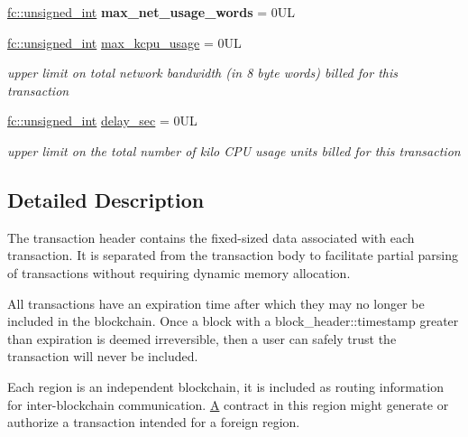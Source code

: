 \begin{DoxyCompactItemize}
\mbox{\label{structaacio_1_1chain_1_1transaction__header_a93d0c99de80b72d19810a625adbb388f}} 
\mbox{\hyperlink{structfc_1_1unsigned__int}{fc\+::unsigned\+\_\+int}} {\bfseries max\+\_\+net\+\_\+usage\+\_\+words} = 0\+UL
\item 
\mbox{\label{structaacio_1_1chain_1_1transaction__header_ae053caa430e5ec80248ddb445e081029}} 
\mbox{\hyperlink{structfc_1_1unsigned__int}{fc\+::unsigned\+\_\+int}} \mbox{\hyperlink{structaacio_1_1chain_1_1transaction__header_ae053caa430e5ec80248ddb445e081029}{max\+\_\+kcpu\+\_\+usage}} = 0\+UL
\begin{DoxyCompactList}\small\item\em upper limit on total network bandwidth (in 8 byte words) billed for this transaction \end{DoxyCompactList}\item 
\mbox{\label{structaacio_1_1chain_1_1transaction__header_a383fbc0b9ab2e344e44c054e9bcacfae}} 
\mbox{\hyperlink{structfc_1_1unsigned__int}{fc\+::unsigned\+\_\+int}} \mbox{\hyperlink{structaacio_1_1chain_1_1transaction__header_a383fbc0b9ab2e344e44c054e9bcacfae}{delay\+\_\+sec}} = 0\+UL
\begin{DoxyCompactList}\small\item\em upper limit on the total number of kilo C\+PU usage units billed for this transaction \end{DoxyCompactList}\end{DoxyCompactItemize}


\subsection{Detailed Description}
The transaction header contains the fixed-\/sized data associated with each transaction. It is separated from the transaction body to facilitate partial parsing of transactions without requiring dynamic memory allocation.

All transactions have an expiration time after which they may no longer be included in the blockchain. Once a block with a block\+\_\+header\+::timestamp greater than expiration is deemed irreversible, then a user can safely trust the transaction will never be included.

Each region is an independent blockchain, it is included as routing information for inter-\/blockchain communication. \mbox{\hyperlink{struct_a}{A}} contract in this region might generate or authorize a transaction intended for a foreign region. 

